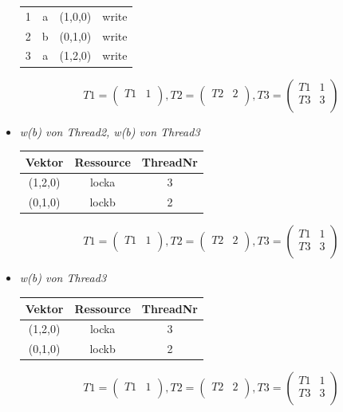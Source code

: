 \documentclass[10pt,a4paper]{article}
\begin{document}
\begin{flushleft}
\begin{itemize}
\begin{tabular}{ c c c c }
  	1 & a & (1,0,0) & write \\
  	2 & b & (0,1,0) & write \\
  	3 & a & (1,2,0) & write \\\hline
\end{tabular}
\[
	T1 = \begin{pmatrix}
		T1 & 1\\
	\end{pmatrix}
	, T2 = \begin{pmatrix}
		T2 & 2\\
	\end{pmatrix}
	, T3 = \begin{pmatrix}
		T1 & 1\\		
		T3 & 3\\
	\end{pmatrix}
\]
\item \textit{w(b) von Thread2, w(b) von Thread3}\\[0.3cm]
\begin{tabular}{ c c c }
  	Vektor & Ressource & ThreadNr \\\hline
  	(1,2,0) & locka & 3 \\
  	(0,1,0) & lockb & 2 \\\hline
\end{tabular}
\[
	T1 = \begin{pmatrix}
		T1 & 1\\
	\end{pmatrix}
	, T2 = \begin{pmatrix}
		T2 & 2\\
	\end{pmatrix}
	, T3 = \begin{pmatrix}
		T1 & 1\\		
		T3 & 3\\
	\end{pmatrix}
\]
\item \textit{w(b) von Thread3}\\[0.3cm]
\begin{tabular}{ c c c }
  	Vektor & Ressource & ThreadNr \\\hline
  	(1,2,0) & locka & 3 \\
  	(0,1,0) & lockb & 2 \\\hline
\end{tabular}
\[
	T1 = \begin{pmatrix}
		T1 & 1\\
	\end{pmatrix}
	, T2 = \begin{pmatrix}
		T2 & 2\\
	\end{pmatrix}
	, T3 = \begin{pmatrix}
		T1 & 1\\		
		T3 & 3\\
	\end{pmatrix}
\]
\end{itemize}
\end{flushleft}
\end{document}
